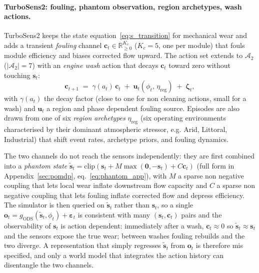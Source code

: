 \documentclass{article}
\begin{document}
\paragraph{TurboSens2: fouling, phantom observation, region archetypes, wash actions.}
TurboSens2 keeps the state equation~\ref{eq:s_transition} for mechanical wear and adds a transient \emph{fouling} channel $\mathbf{c}_t \in \mathbb{R}_{\ge 0}^{K_c}$ ($K_c{=}5$, one per module) that fouls module efficiency and biases corrected flow upward. The action set extends to $\mathcal{A}_2$ ($|\mathcal{A}_2|{=}7$) with an \emph{engine wash} action that decays $\mathbf{c}_t$ toward zero without touching $\mathbf{s}_t$:
\begin{equation}
    \mathbf{c}_{t+1} \;=\; \gamma(a_t)\,\mathbf{c}_t \;+\; \mathbf{u}_t(\phi_t,\, \eta_\mathrm{reg}) \;+\; \boldsymbol{\zeta}_t,
\end{equation}
with $\gamma(a_t)$ the decay factor (close to one for non cleaning actions, small for a wash) and $\mathbf{u}_t$ a region and phase dependent fouling source. Episodes are also drawn from one of six \emph{region archetypes} $\eta_\mathrm{reg}$ (six operating environments characterised by their dominant atmospheric stressor, e.g. Arid, Littoral, Industrial) that shift event rates, archetype priors, and fouling dynamics.

The two channels do not reach the sensors independently: they are first combined into a \emph{phantom state} $\tilde{\mathbf{s}}_t = \mathrm{clip}(\mathbf{s}_t + M\max(\mathbf{0}, -\mathbf{s}_t) + C\mathbf{c}_t)$ (full form in Appendix~\ref{sec:pomdp}, eq.~\ref{eq:phantom_app}), with $M$ a sparse non negative coupling that lets local wear inflate downstream flow capacity and $C$ a sparse non negative coupling that lets fouling inflate corrected flow and depress efficiency. The simulator is then queried on $\tilde{\mathbf{s}}_t$ rather than $\mathbf{s}_t$, so a single $\mathbf{o}_t = g_\mathrm{ODS}(\tilde{\mathbf{s}}_t, \phi_t) + \boldsymbol{\varepsilon}_t$ is consistent with many $(\mathbf{s}_t, \mathbf{c}_t)$ pairs and the observability of $\mathbf{s}_t$ is action dependent: immediately after a wash, $\mathbf{c}_t \approx 0$ so $\tilde{\mathbf{s}}_t \approx \mathbf{s}_t$ and the sensors expose the true wear; between washes fouling rebuilds and the two diverge. A representation that simply regresses $\tilde{\mathbf{s}}_t$ from $\mathbf{o}_t$ is therefore mis specified, and only a world model that integrates the action history can disentangle the two channels.
\end{document}
